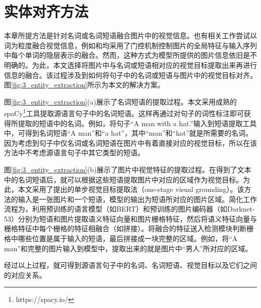 \section{实体对齐方法}
\label{sec:3_entity_extraction}
本章所提方法是针对名词或名词短语融合图片中的视觉信息。也有相关工作尝试以词为粒度融合视觉信息，例如和均采用了门控机制控制图片的全局特征与输入序列中每个单词的隐层表示的融合。然而，这种方式为模型所提供的图片信息依旧是不明确的。为此，本文选择将图片中与名词或短语相对应的视觉目标提取出来再进行信息的融合。该过程涉及到如何将句子中的名词或短语与图片中的视觉目标对齐。图\ref{fig:3_entity_extraction}所示为本文的解决方案。


图\ref{fig:3_entity_extraction}(a)展示了名词短语的提取过程。本文采用成熟的spaCy\footnote{https://spacy.io/}工具提取源语言句子中的名词短语。这样再通过对句子的词性标注即可获得所提取的短语中的名词。例如，将句子“A man with a hat.”输入到短语提取工具中，可得到名词短语“A man”和“a hat”，其中“man”和“hat”就是所需要的名词。因为考虑到句子中仅名词或名词短语在图片中有着直接对应的视觉目标，所以在该方法中不考虑源语言句子中其它类型的短语。

图\ref{fig:3_entity_extraction}(b)展示了图片中视觉特征的提取过程。在得到了文本中的名词短语后，就可以根据这些短语提取图片中对应的区域作为视觉目标。为此，本文采用了提出的单步视觉目标提取法（one-stage visual grounding）。该方法的输入是一张图片和一个短语，模型的输出为短语所对应的图片区域。简化工作流程为，利用预训练的语言模型（如BERT）和预训练的图片编码器（如Darknet-53）分别为短语和图片提取语义特征向量和图片栅格特征，然后将语义特征向量与栅格特征中每个栅格的特征相融合（如拼接）。将融合的特征送入检测模块判断栅格中哪些位置是属于输入的短语，最后拼接成一块完整的区域。例如，将“A man”和完整的图片输入到模型中，提取出来的就是图片中“男人”所对应的区域。

经过以上过程，就可得到源语言句子中的名词、名词短语、视觉目标以及它们之间的对应关系。